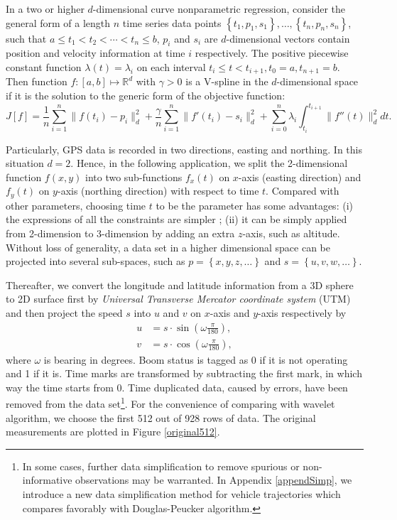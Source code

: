 In a two or higher $d$-dimensional curve nonparametric regression, consider the general form of a length $n$ time series data points $\left\lbrace t_1,p_1,s_1\right\rbrace, \ldots, \left\lbrace t_n,p_n,s_n\right\rbrace$, such that $a \leq t_1<t_2< \cdots < t_n \leq b$, $p_i$ and $s_i$ are $d$-dimensional vectors contain position and velocity information at time $i$ respectively. The positive piecewise constant function $\lambda(t) = \lambda_i$ on each interval $t_i \leq t<t_{i+1}, t_0=a, t_{n+1}=b$.  Then function $f:[a,b]\mapsto\mathbb{R}^d$ with $\gamma>0$ is a V-spline in the $d$-dimensional space if it is the solution to the generic form of the objective function: 
\begin{equation}\label{tractorsplineObjective2D}
J[f]= \frac{1}{n} \sum_{i=1}^{n} \lVert f(t_i)-p_i\rVert_d^2 + \frac{\gamma}{n} \sum_{i=1}^{n} \lVert f'(t_i)-s_i \rVert_d^2 +\sum_{i=0}^{n} \lambda_i\int_{t_i}^{t_{i+1}} \lVert f''(t)\rVert_d^2 dt. 
\end{equation}


Particularly, GPS data is recorded in two directions, easting and northing. In this situation $d=2$. Hence, in the following application, we split the 2-dimensional function $f(x,y)$ into two sub-functions $f_x(t)$ on $x$-axis (easting direction) and $f_y(t)$ on $y$-axis (northing direction) with respect to time $t$. Compared with other parameters, choosing time $t$ to be the parameter has some advantages: (i) the expressions of all the constraints are simpler \citep{zhang2013cubic}; (ii) it can be simply applied from 2-dimension to 3-dimension by adding an extra $z$-axis, such as altitude. Without loss of generality, a data set in a higher dimensional space can be projected into several sub-spaces, such as $p=\left\lbrace x,y,z,\ldots \right\rbrace$ and $s=\left\lbrace u,v,w,\ldots \right\rbrace$. 


Thereafter, we convert the longitude and latitude information from a 3D sphere to 2D surface first by \textit{Universal Transverse Mercator coordinate system} (UTM) and then project the speed $s$ into $u$ and $v$ on $x$-axis and $y$-axis respectively by 
\begin{align}
u &=s\cdot \sin \left(\omega\frac{\pi}{180}\right),\\
v &= s\cdot \cos \left(\omega\frac{\pi}{180}\right),
\end{align}
where $\omega$ is bearing in degrees. Boom status is tagged as 0 if it is not operating and 1 if it is. Time marks are transformed by subtracting the first mark, in which way the time starts from 0. Time duplicated data, caused by errors, have been removed from the data set\footnote{In some cases, further data simplification to remove spurious or non-informative observations may be warranted. In Appendix \ref{appendSimp}, we introduce a new data simplification method for vehicle trajectories which compares favorably with Douglas-Peucker algorithm.  }. For the convenience of comparing with wavelet algorithm, we choose the first 512 out of 928 rows of data. The original measurements are plotted in Figure \ref{original512}.


